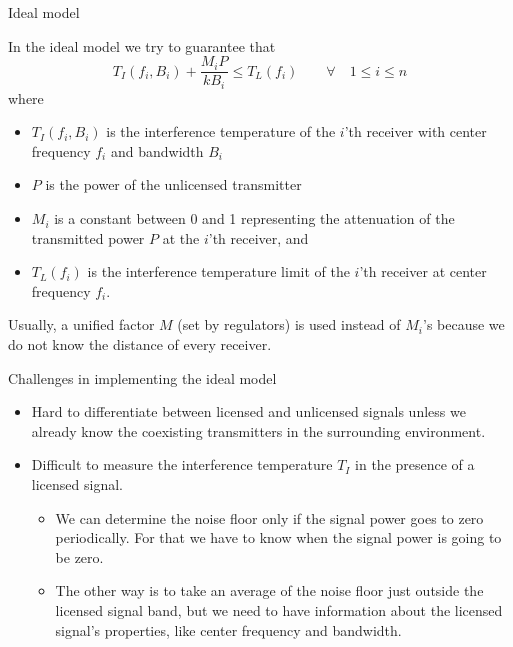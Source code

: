 \documentclass[mathserif]{beamer}
\begin{document}
\begin{frame}{Ideal model}

In the ideal model we try to guarantee that
\begin{equation}
    T_I(f_i,B_i) + \frac{M_iP}{kB_i} \leq T_L(f_i) \qquad \forall \quad 1 \leq i \leq n \label{idealModel}
\end{equation}
where

\pause
\begin{itemize}
	
	\item $T_I(f_i,B_i)$ is  the interference temperature of the $i$'th receiver with center frequency $f_i$ and bandwidth $B_i$
	\item $P$ is the power of the unlicensed transmitter
	\item $M_i$ is a constant between 0 and 1 representing the attenuation of the  transmitted power $P$ at the $i$'th receiver, and
	\item $T_L(f_i)$ is the interference temperature limit of the $i$'th receiver at center frequency $f_i$.
\end{itemize}

\pause
Usually, a unified factor $M$ (set by regulators) is used instead of $M_i$'s because we do not know the distance of every receiver. \end{frame}




\begin{frame}{Challenges in implementing the ideal model}

\begin{itemize}
    \item Hard to differentiate between licensed and unlicensed signals unless we already know the coexisting transmitters in the surrounding environment.
    \item Difficult to measure the interference temperature $T_I$ in the presence of a licensed signal. \begin{itemize}
    \item We can determine the noise floor only if the signal power goes to zero periodically. For that we have to know when the signal power is going to be zero.
    \item The other way is to take an average of the noise floor just outside the licensed signal band, but we need to have information about the licensed signal's properties, like center frequency and bandwidth.
    \end{itemize}
\end{itemize}

\end{frame}
\end{document}
